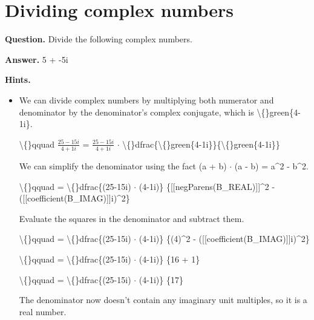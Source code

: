 \documentclass{article}
\begin{document}
\section*{Dividing complex numbers}
\textbf{Question.} Divide the following complex numbers.

\textbf{Answer.} 5 + -5i

\textbf{Hints.}
\begin{itemize}
  \item We can divide complex numbers by multiplying both numerator and denominator by the denominator's complex conjugate, which is \textbackslash\{\}green\{4-1i\}.
                
                
                    \textbackslash\{\}qquad $\frac{25-15i}{4+1i}$ =
                        $\frac{25-15i}{4+1i}$ $\cdot$
                        \textbackslash\{\}dfrac\{\textbackslash\{\}green\{4-1i\}\}\{\textbackslash\{\}green\{4-1i\}\}
                    
                
                
                    
                        We can simplify the denominator using the fact (a + b) $\cdot$ (a - b) = a\textasciicircum{}2 - b\textasciicircum{}2.
                    
                    
                        \textbackslash\{\}qquad = \textbackslash\{\}dfrac\{(25-15i) $\cdot$ (4-1i)\}
                        \{[[negParens(B\_REAL)]]\textasciicircum{}2 - ([[coefficient(B\_IMAG)]]i)\textasciicircum{}2\}
                    
                
                
                    
                        Evaluate the squares in the denominator and subtract them.
                    
                    
                        \textbackslash\{\}qquad = \textbackslash\{\}dfrac\{(25-15i) $\cdot$ (4-1i)\}
                        \{(4)\textasciicircum{}2 - ([[coefficient(B\_IMAG)]]i)\textasciicircum{}2\}
                    
                    
                        \textbackslash\{\}qquad = \textbackslash\{\}dfrac\{(25-15i) $\cdot$ (4-1i)\}
                        \{16 + 1\}
                    
                    
                        \textbackslash\{\}qquad = \textbackslash\{\}dfrac\{(25-15i) $\cdot$ (4-1i)\}
                        \{17\}
                    
                    The denominator now doesn't contain any imaginary unit multiples, so it is a real number.
                    

\end{itemize}
\end{document}
